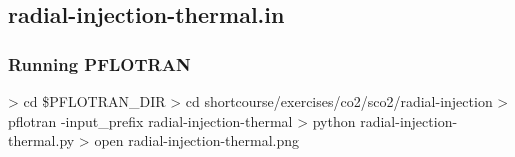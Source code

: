 \documentclass{beamer}
\begin{document}
\subsection{radial-injection-thermal.in}

\begin{frame}[fragile]\frametitle{Running PFLOTRAN}

\begin{semiverbatim}

> cd \$PFLOTRAN_DIR
> cd shortcourse/exercises/co2/sco2/radial-injection
> pflotran -input_prefix radial-injection-thermal
> python radial-injection-thermal.py
> open radial-injection-thermal.png
\end{semiverbatim}

\end{frame}
\end{document}
